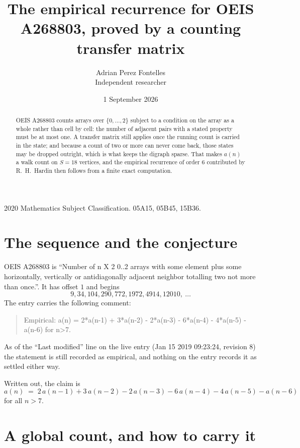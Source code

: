 \documentclass[11pt,a4paper]{article}
\title{The empirical recurrence for OEIS A268803, proved by a counting transfer matrix}
\author{Adrian Perez Fontelles\\ \small Independent researcher}
\date{1 September 2026}
\theoremstyle{plain}
\theoremstyle{definition}
\begin{document}
\maketitle

\begin{abstract}
OEIS A268803 counts arrays over $\{0,\dots,2\}$ subject to a condition on the array as a
whole rather than cell by cell: the number of adjacent pairs with a stated property must be
at most one. A transfer matrix still applies once the running count is carried in the state; and
because a count of two or more can never come back, those states may be dropped outright,
which is what keeps the digraph sparse. That makes $a(n)$ a walk count on $S=18$ vertices,
and the empirical recurrence of order $6$ contributed by R.~H.~Hardin then follows from
a finite exact computation.
\end{abstract}

\noindent\small 2020 Mathematics Subject Classification. 05A15, 05B45, 15B36.\normalsize

\section{The sequence and the conjecture}

OEIS A268803 is ``Number of n X 2 0..2 arrays with some element plus some horizontally, vertically or antidiagonally adjacent neighbor totalling two not more than once.''. It has offset $1$ and begins
\[
9, 34, 104, 290, 772, 1972, 4914, 12010,\ \dots
\]
The entry carries the following comment:
\begin{quote}\small
Empirical: a(n) = 2*a(n-1) + 3*a(n-2) - 2*a(n-3) - 6*a(n-4) - 4*a(n-5) - a(n-6) for n>7.
\end{quote}
As of the ``Last modified'' line on the live entry (Jan 15 2019 09:23:24, revision 8) the statement is
still recorded as empirical, and nothing on the entry records it as settled either way.

Written out, the claim is
\begin{equation}\label{eq:conj}
a(n)\;=\;2\,a(n-1) + 3\,a(n-2) - 2\,a(n-3) - 6\,a(n-4) - 4\,a(n-5) - a(n-6)
\end{equation}
for all $n>7$.

\section{A global count, and how to carry it}
\end{document}
